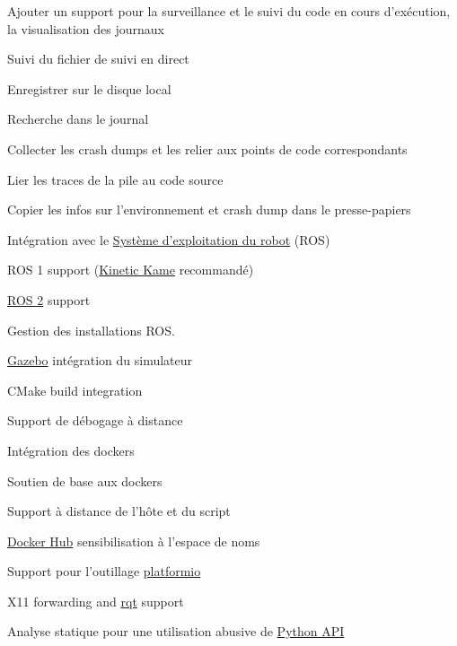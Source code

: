 \begin{multicols}{2}
\begin{todolist}
\item[\done]Ajouter un support pour la surveillance et le suivi du code en cours d'exécution, la visualisation des journaux
\begin{todolist}
\item Suivi du fichier de suivi en direct
\item Enregistrer sur le disque local
\item Recherche dans le journal
\end{todolist}
\item Collecter les crash dumps et les relier aux points de code correspondants
\begin{todolist}
\item Lier les traces de la pile au code source
\item Copier les infos sur l'environnement et crash dump dans le presse-papiers
\end{todolist}
\item Intégration avec le \href{https://www.ros.org}{Système d'exploitation du robot} (ROS)
\begin{todolist}
\item[\done] ROS 1 support (\href{https://wiki.ros.org/kinetic}{Kinetic Kame} recommandé)
\item \href{https://github.com/ros2/ros2/wiki}{ROS 2} support
\item[\done] Gestion des installations ROS.
\end{todolist}
\item[\done] \href{http://gazebosim.org/}{Gazebo} intégration du simulateur
\item CMake build integration
\item Support de débogage à distance
\item Intégration des dockers
\begin{todolist}
\item[\done] Soutien de base aux dockers
\item Support à distance de l'hôte et du script
\item \href{https://hub.docker.com}{Docker Hub} sensibilisation à l'espace de noms
\item Support pour l'outillage \href{https://platformio.org}{platformio}
\item X11 forwarding and \href{https://wiki.ros.org/rqt}{rqt} support
\end{todolist}
\item Analyse statique pour une utilisation abusive de \href{https://wiki.ros.org/rospy}{Python API}

\end{todolist}
\end{multicols}
